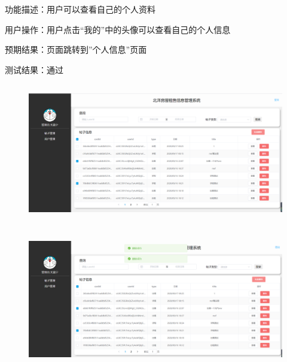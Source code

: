 功能描述：用户可以查看自己的个人资料
   
用户操作：用户点击“我的”中的头像可以查看自己的个人信息

预期结果：页面跳转到”个人信息”页面

测试结果：通过
\begin{figure}[htbp]
    \centering
    \begin{minipage}[t]{0.9\textwidth}
    \centering
    \includegraphics[width=12cm,height=6cm]{test/image/adm13.png} 
    \end{minipage}
    \end{figure}  
    \begin{figure}[htbp]
        \centering
        \begin{minipage}[t]{0.9\textwidth}
        \centering
        \includegraphics[width=12cm,height=6cm]{test/image/adm14.png} 
        \end{minipage}
        \end{figure}      